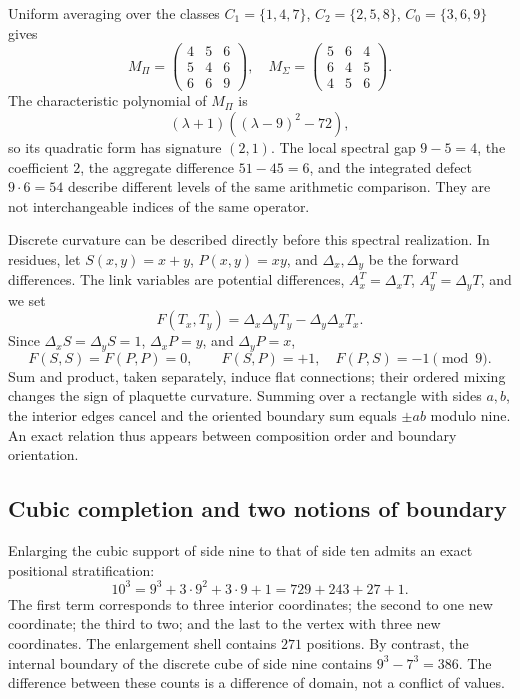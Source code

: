 Uniform averaging over the classes \(C_1=\{1,4,7\}\), \(C_2=\{2,5,8\}\), \(C_0=\{3,6,9\}\) gives
\[
 M_\Pi=\begin{pmatrix}4&5&6\\5&4&6\\6&6&9\end{pmatrix},\quad
 M_\Sigma=\begin{pmatrix}5&6&4\\6&4&5\\4&5&6\end{pmatrix}.
\]
The characteristic polynomial of \(M_\Pi\) is
\[
 (\lambda+1)((\lambda-9)^2-72),
\]
so its quadratic form has signature \((2,1)\). The local spectral gap \(9-5=4\), the coefficient \(2\), the aggregate difference \(51-45=6\), and the integrated defect \(9\cdot6=54\) describe different levels of the same arithmetic comparison. They are not interchangeable indices of the same operator.

Discrete curvature can be described directly before this spectral realization. In residues, let \(S(x,y)=x+y\), \(P(x,y)=xy\), and \(\Delta_x,\Delta_y\) be the forward differences. The link variables are potential differences, \(A_x^T=\Delta_xT\), \(A_y^T=\Delta_yT\), and we set
\[
 F(T_x,T_y)=\Delta_x\Delta_yT_y-\Delta_y\Delta_xT_x.
\]
Since \(\Delta_xS=\Delta_yS=1\), \(\Delta_xP=y\), and \(\Delta_yP=x\),
\begin{equation}
 F(S,S)=F(P,P)=0,\qquad F(S,P)=+1,\quad F(P,S)=-1\pmod9.
\end{equation}
Sum and product, taken separately, induce flat connections; their ordered mixing changes the sign of plaquette curvature. Summing over a rectangle with sides \(a,b\), the interior edges cancel and the oriented boundary sum equals \(\pm ab\) modulo nine. An exact relation thus appears between composition order and boundary orientation.

\subsection{Cubic completion and two notions of boundary}

Enlarging the cubic support of side nine to that of side ten admits an exact positional stratification:
\begin{equation}
 10^3=9^3+3\cdot9^2+3\cdot9+1=729+243+27+1.
 \label{eq:cubo}
\end{equation}
The first term corresponds to three interior coordinates; the second to one new coordinate; the third to two; and the last to the vertex with three new coordinates. The enlargement shell contains \(271\) positions. By contrast, the internal boundary of the discrete cube of side nine contains \(9^3-7^3=386\). The difference between these counts is a difference of domain, not a conflict of values.

